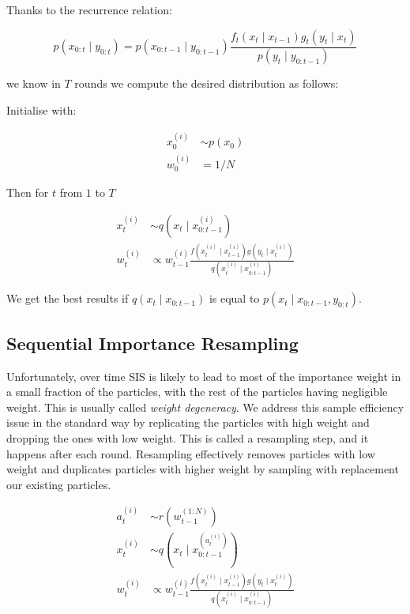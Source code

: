 \documentclass[
]{ceurart}
\begin{document}
Thanks to the recurrence relation:

\begin{equation}
p(x_{0:t} \mid y_{0:t}) = p(x_{0:t-1} \mid y_{0:t-1}) \frac{f_t(x_t \mid x_{t-1}) g_t(y_t \mid x_t)}{p(y_t \mid y_{0:t-1})}
\end{equation}

we know in $T$ rounds we compute the desired distribution as follows:

Initialise with:

\begin{align}
x_0^{(i)} &\sim p(x_0) \\
w_0^{(i)} &= 1/N
\end{align}

Then for $t$ from $1$ to $T$

\begin{align}
  x_t^{(i)} &\sim q(x_t \mid x^{(i)}_{0:t-1}) \\
  w_t^{(i)} &\propto w_{t-1}^{(i)} \frac{f(x^{(i)}_t \mid x^{(i)}_{t-1})g(y_t \mid x^{(i)}_t)}{q(x^{(i)}_t \mid x^{(i)}_{0:t-1})}
\end{align}

We get the best results if $q(x_t \mid x_{0:t-1})$ is equal to $p(x_t \mid x_{0:t-1}, y_{0:t})$.

\subsection{Sequential Importance Resampling}

Unfortunately, over time SIS is likely to lead to most of the
importance weight in a small fraction of the particles, with the rest
of the particles having negligible weight. This is usually called
\emph{weight degeneracy}. We address this sample efficiency issue in
the standard way by replicating the particles with high weight and
dropping the ones with low weight. This is called a resampling step,
and it happens after each round. Resampling effectively removes
particles with low weight and duplicates particles with higher weight
by sampling with replacement our existing particles.

\begin{align*}
  a_t^{(i)} &\sim r(w_{t-1}^{(1:N)}) \\
  x_t^{(i)} &\sim q(x_t \mid x^{(a_t^{(i)})}_{0:t-1}) \\
  w_t^{(i)} &\propto w_{t-1}^{(i)} \frac{f(x^{(i)}_t \mid x^{(i)}_{t-1})g(y_t \mid x^{(i)}_t)}{q(x^{(i)}_t \mid x^{(i)}_{0:t-1})}
\end{align*}
\end{document}
